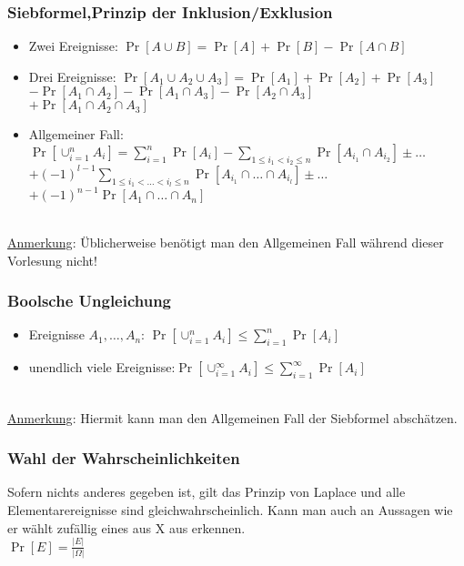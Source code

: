 \subsubsection{Siebformel,Prinzip der Inklusion/Exklusion}
\begin{itemize}
\item Zwei Ereignisse: $\Pr[A\cup B]=\Pr[A]+\Pr[B]-\Pr[A\cap B]$
\item Drei Ereignisse: $\Pr[A_1\cup A_2\cup A_3]=\Pr[A_1]+\Pr[A_2]+\Pr[A_3]$\\
				$-\Pr[A_1\cap A_2]-\Pr[A_1\cap A_3]-\Pr[A_2\cap A_3]$\\
				$+\Pr[A_1\cap A_2\cap A_3]$
\item Allgemeiner Fall: $\Pr[\cup^n_{i=1}A_i]=\sum_{i=1}^n\Pr[A_i]-\sum_{1\leq i_1<i_2\leq n}\Pr[A_{i_1}\cap A_{i_2}]\pm \ldots$\\
				$+(-1)^{l-1}\sum_{1\leq i_1<\ldots<i_l\leq n}\Pr[A_{i_1}\cap\ldots\cap A_{i_l}]\pm\ldots$\\
				$+(-1)^{n-1}\Pr[A_1\cap\ldots\cap A_n]$
\end{itemize}
\\
\underline{Anmerkung}: Üblicherweise benötigt man den Allgemeinen Fall während dieser Vorlesung nicht!\\

\subsubsection{Boolsche Ungleichung}

\begin{itemize}
\item Ereignisse $A_1,\ldots, A_n$: $\Pr[\cup_{i=1}^n A_i]\leq\sum_{i=1}^n\Pr[A_i]$
\item unendlich viele Ereignisse:$\Pr[\cup^\infty_{i=1} A_i]\leq\sum^\infty_{i=1}\Pr[A_i]$
\end{itemize}
\\
\underline{Anmerkung}: Hiermit kann man den Allgemeinen Fall der Siebformel abschätzen.

\subsubsection{Wahl der Wahrscheinlichkeiten}
Sofern nichts anderes gegeben ist, gilt das Prinzip von Laplace und alle Elementarereignisse sind gleichwahrscheinlich. Kann man auch an Aussagen wie er wählt zufällig eines aus X aus erkennen.\\
$\Pr[E]=\frac{|E|}{|\Omega |}$

